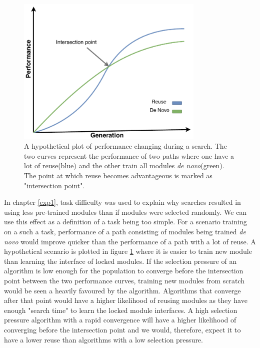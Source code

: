 \begin{figure}[ht]
    \centering
    \includegraphics[width=0.8\textwidth]{Chapters/4.Experiments/exp2/figures/reuse_vs_new.pdf}
    \caption[Hypothetical performance plot]{A hypothetical plot of performance changing during a search. The two curves represent the performance of two paths where one have a lot of reuse(blue) and the other train all modules \textit{de novo}(green). The point at which reuse becomes advantageous is marked as "intersection point".}
    \label{fig:reuse_vs_new}
\end{figure}

In chapter \ref{exp1}, task difficulty was used to explain why searches resulted in using less pre-trained modules than if modules were selected randomly. We can use this effect as a definition of a task being too simple. For a scenario training on a such a task, performance of a path consisting of modules being trained \textit{de novo} would improve quicker than the performance of a path with a lot of reuse. A hypothetical scenario is plotted in figure \ref{fig:reuse_vs_new} where it is easier to train new module than learning the interface of locked modules. If the selection pressure of an algorithm is low enough for the population to converge before the intersection point between the two performance curves, training new modules from scratch would be seen a heavily favoured by the algorithm.  Algorithms that converge after that point would have a higher likelihood of reusing modules as they have enough "search time" to learn the locked module interfaces. A high selection pressure algorithm with a rapid convergence will have a higher likelihood of converging before the intersection point and we would, therefore, expect it to have a lower reuse than algorithms with a low selection pressure. 

